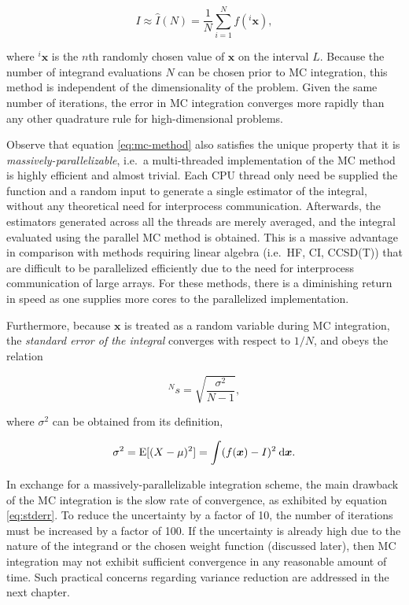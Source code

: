 \begin{equation}
	I \approx \hat I(N) = \frac{1}{N} \sum_{i = 1}^N f(^i \bm x),
	\label{eq:mc-method}
\end{equation}

\noindent where $^i \bm x$ is the $n$th randomly chosen value of $\bm x$ on the
interval $L$. Because the number of integrand evaluations $N$ can be chosen
prior to MC integration, this method is independent of the dimensionality of the
problem.  Given the same number of iterations, the error in MC integration
converges more rapidly than any other quadrature rule for high-dimensional
problems.

Observe that equation \ref{eq:mc-method} also satisfies the unique property that
it is \emph{massively-parallelizable}, i.e.\ a multi-threaded implementation of
the MC method is highly efficient and almost trivial. Each CPU thread only need
be supplied the function and a random input to generate a single estimator of
the integral, without any theoretical need for interprocess communication.
Afterwards, the estimators generated across all the threads are merely averaged,
and the integral evaluated using the parallel MC method is obtained. This is a
massive advantage in comparison with methods requiring linear algebra (i.e.\ HF,
CI, CCSD(T)) that are difficult to be parallelized efficiently due to the need
for interprocess communication of large arrays. For these methods, there is a
diminishing return in speed as one supplies more cores to the parallelized
implementation.

Furthermore, because $\bm x$ is treated as a random variable during MC
integration, the \emph{standard error of the integral} converges with respect to
$1/N$, and obeys the relation

\begin{equation}
	^Ns = \sqrt{\frac{\sigma^2}{N - 1}},
	\label{eq:stderr}
\end{equation}

\noindent where $\sigma^2$ can be obtained from its definition,

\begin{equation}
	\sigma^2 = \text E[(X - \mu)^2] = \int (f(\bm x) - I)^2  \:\mathrm{d} \bm x.
\end{equation}

In exchange for a massively-parallelizable integration scheme, the main drawback
of the MC integration is the slow rate of convergence, as exhibited by equation
\ref{eq:stderr}. To reduce the uncertainty by a factor of 10, the number of
iterations must be increased by a factor of 100. If the uncertainty is already
high due to the nature of the integrand or the chosen weight function (discussed
later), then MC integration may not exhibit sufficient convergence in any
reasonable amount of time. Such practical concerns regarding variance reduction
are addressed in the next chapter.

